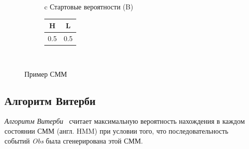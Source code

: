 \begin{figure}
\centering
	\begin{subfigure}{\textwidth}
		\centering
	\end{subfigure}
	\newline
	\vspace{1cm}
	\begin{subfigure}{\textwidth}
		\centering
		\begin{tabular}{c}
			Стартовые вероятности (B) \\
			\begin{tabular}{|c|c|}
				\hline
				H & L \\
				\hline
				0.5 & 0.5 \\
				\hline
			\end{tabular} \\
		\end{tabular}
		\vspace{0.3cm}
	\end{subfigure}
\caption{Пример СММ}
\label{fig:HMM}
\end{figure}


\subsection{Алгоритм Витерби}
\label{lab:Viterbi}
\emph{Алгоритм Витерби}~\cite{Viterbi} считает максимальную вероятность нахождения в каждом состоянии СММ (англ. HMM) при условии того, что последовательность событий \emph{Obs} была сгенерирована этой СММ.

